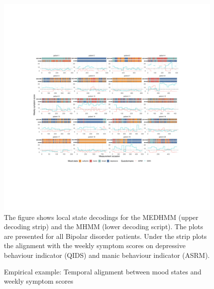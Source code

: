 \begin{figure}
    \centering    
    \caption{Empirical example: Temporal alignment between mood states and weekly symptom scores}
 \includegraphics[width=\linewidth]{graphics/decoding_all.pdf}
 \flushleft
 \footnotesize
 The figure shows local state decodings for the MEDHMM (upper decoding strip) and the MHMM (lower decoding script). The plots are presented for all Bipolar disorder patients. Under the strip plots the alignment with the weekly symptom scores on depressive behaviour indicator (QIDS) and manic behaviour indicator (ASRM).
    \label{decoding_all}
\end{figure}


